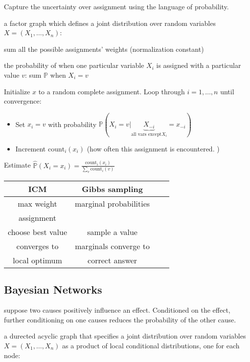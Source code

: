 Capture the uncertainty over assignment using the language of probability.

 a factor graph which defines a joint distribution over
random variables $X = (X_1,\dots,X_n)$:

 sum all the possible assignments'
weights (normalization constant)

 the probability of when one particular variable
$X_i$ is assigned with a particular value $v$: sum $\mathbb{P}$ when $X_i = v$

 Initialize $x$ to a random complete assignment.
Loop through $i=1,\dots,n$ until convergence: \begin{itemize}
    \item Set $x_i = v$ with probability $\mathbb{P}(X_i = v | \underbrace{X_{-i}}_{\text{all vars except} X_i}=x_{-i})$
    \item Increment $\text{count}_i(x_i)$ (how often this assignment is encountered. )
\end{itemize}
Estimate $\hat{\mathbb{P}}(X_i=x_i)=\frac{\text{count}_i(x_i)}{\sum_{v}\text{count}_i(v)}$

\begin{tabular}{|c|c|c|c|} 
    \hline
    \textbf{ICM} & \textbf{Gibbs sampling} \\
    \hline
    max weight & marginal probabilities \\ 
    assignment &   \\ 
    \hline
    choose best value & sample a value \\
    \hline
    converges to & marginals converge to\\
    local optimum & correct answer \\
    \hline
\end{tabular}

\subsection{Bayesian Networks}

 suppose two causes positively influence an effect.
Conditioned on the effect, further conditioning on one causes reduces the
probability of the other cause.

 a durected acyclic graph that specifies a joint distribution
over random variables $X=(X_1,\dots,X_n)$ as a product of local conditional distributions,
one for each node: 

